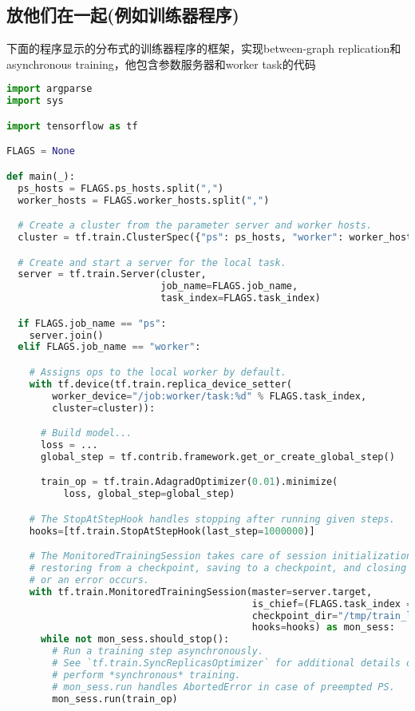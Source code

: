 \subsection{放他们在一起(例如训练器程序)}
下面的程序显示的分布式的训练器程序的框架，实现between-graph replication和asynchronous training，他包含参数服务器和worker task的代码
\begin{lstlisting}[language=Python]
import argparse
import sys

import tensorflow as tf

FLAGS = None

def main(_):
  ps_hosts = FLAGS.ps_hosts.split(",")
  worker_hosts = FLAGS.worker_hosts.split(",")

  # Create a cluster from the parameter server and worker hosts.
  cluster = tf.train.ClusterSpec({"ps": ps_hosts, "worker": worker_hosts})

  # Create and start a server for the local task.
  server = tf.train.Server(cluster,
                           job_name=FLAGS.job_name,
                           task_index=FLAGS.task_index)

  if FLAGS.job_name == "ps":
    server.join()
  elif FLAGS.job_name == "worker":

    # Assigns ops to the local worker by default.
    with tf.device(tf.train.replica_device_setter(
        worker_device="/job:worker/task:%d" % FLAGS.task_index,
        cluster=cluster)):

      # Build model...
      loss = ...
      global_step = tf.contrib.framework.get_or_create_global_step()

      train_op = tf.train.AdagradOptimizer(0.01).minimize(
          loss, global_step=global_step)

    # The StopAtStepHook handles stopping after running given steps.
    hooks=[tf.train.StopAtStepHook(last_step=1000000)]

    # The MonitoredTrainingSession takes care of session initialization,
    # restoring from a checkpoint, saving to a checkpoint, and closing when done
    # or an error occurs.
    with tf.train.MonitoredTrainingSession(master=server.target,
                                           is_chief=(FLAGS.task_index == 0),
                                           checkpoint_dir="/tmp/train_logs",
                                           hooks=hooks) as mon_sess:
      while not mon_sess.should_stop():
        # Run a training step asynchronously.
        # See `tf.train.SyncReplicasOptimizer` for additional details on how to
        # perform *synchronous* training.
        # mon_sess.run handles AbortedError in case of preempted PS.
        mon_sess.run(train_op)


\end{lstlisting}
